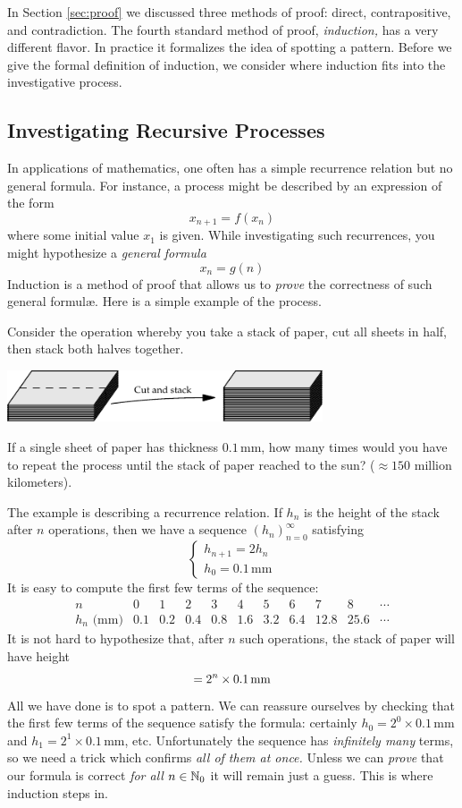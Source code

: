 In Section \ref{sec:proof} we discussed three methods of proof: direct, contrapositive, and contradiction. The fourth standard method of proof, \emph{induction,} has a very different flavor. In practice it formalizes the idea of spotting a pattern. Before we give the formal definition of induction, we consider where induction fits into the investigative process.

\subsection{Investigating Recursive Processes}

In applications of mathematics, one often has a simple recurrence relation but no general formula. For instance, a process might be described by an expression of the form
\[
	x_{n+1}=f(x_n)
\]
where some initial value $x_1$ is given. While investigating such recurrences, you might hypothesize a \emph{general formula}
\[
	x_n=g(n)
\]
Induction is a method of proof that allows us to \emph{prove} the correctness of such general formulæ. Here is a simple example of the process.


Consider the operation whereby you take a stack of paper, cut all sheets in half, then stack both halves together.
\begin{center}
	\includegraphics[width=0.7\textwidth]{induction-02-paper}
\end{center}
If a single sheet of paper has thickness $0.1$\,mm, how many times would you have to repeat the process until the stack of paper reached to the sun? ($\approx 150$ million kilometers).\smallbreak

The example is describing a recurrence relation. If $h_n$ is the height of the stack after $n$ operations, then we have a sequence $(h_n)_{n=0}^\infty$ satisfying
\[
	\begin{cases}
		h_{n+1}=2h_n\\
		h_0=0.1\,\text{mm}
	\end{cases}
\]
It is easy to compute the first few terms of the sequence:
\[
	\begin{array}{c|cccccccccc}
		n&0&1&2&3&4&5&6&7&8&\cdots\\\hline
		h_n\text{ (mm)}&0.1&0.2&0.4&0.8&1.6&3.2&6.4&12.8&25.6&\cdots
	\end{array}
\]
It is not hard to hypothesize that, after $n$ such operations, the stack of paper will have height
\[
	=2^n\times 0.1\text{\,mm}
\]
All we have done is to spot a pattern. We can reassure ourselves by checking that the first few terms of the sequence satisfy the formula: certainly $h_0=2^0\times 0.1$\,mm and $h_1=2^1\times 0.1$\,mm, etc. Unfortunately the sequence has \emph{infinitely many} terms, so we need a trick which confirms \emph{all of them at once.} Unless we can \emph{prove} that our formula is correct \emph{for all} $n\in\mathbb{N}_0$ it will remain just a guess. This is where induction steps in.\par

